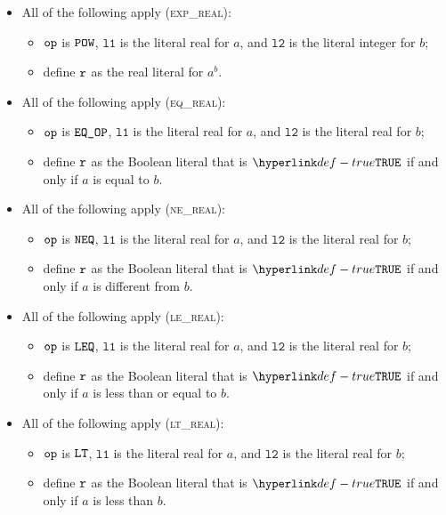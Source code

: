 \documentclass{book}
\newcommand\vlone[0]{\texttt{l1}}
\newcommand\vltwo[0]{\texttt{l2}}
\begin{document}
\begin{itemize}
  \item All of the following apply (\textsc{exp\_real}):
  \begin{itemize}
    \item $\texttt{op}$ is $\texttt{POW}$, $\vlone$ is the literal real for $a$, and $\vltwo$ is the literal integer for $b$;
    \item define $\texttt{r}$ as the real literal for $a^b$.
  \end{itemize}

  \item All of the following apply (\textsc{eq\_real}):
  \begin{itemize}
    \item $\texttt{op}$ is $\texttt{EQ\_OP}$, $\vlone$ is the literal real for $a$, and $\vltwo$ is the literal real for $b$;
    \item define $\texttt{r}$ as the Boolean literal that is $\True$ if and only if $a$ is equal to $b$.
  \end{itemize}

  \item All of the following apply (\textsc{ne\_real}):
  \begin{itemize}
    \item $\texttt{op}$ is $\texttt{NEQ}$, $\vlone$ is the literal real for $a$, and $\vltwo$ is the literal real for $b$;
    \item define $\texttt{r}$ as the Boolean literal that is $\True$ if and only if $a$ is different from $b$.
  \end{itemize}

  \item All of the following apply (\textsc{le\_real}):
  \begin{itemize}
    \item $\texttt{op}$ is $\texttt{LEQ}$, $\vlone$ is the literal real for $a$, and $\vltwo$ is the literal real for $b$;
    \item define $\texttt{r}$ as the Boolean literal that is $\True$ if and only if $a$ is less than or equal to $b$.
  \end{itemize}

  \item All of the following apply (\textsc{lt\_real}):
  \begin{itemize}
    \item $\texttt{op}$ is $\texttt{LT}$, $\vlone$ is the literal real for $a$, and $\vltwo$ is the literal real for $b$;
    \item define $\texttt{r}$ as the Boolean literal that is $\True$ if and only if $a$ is less than $b$.
  \end{itemize}


\end{itemize}
\end{document}
